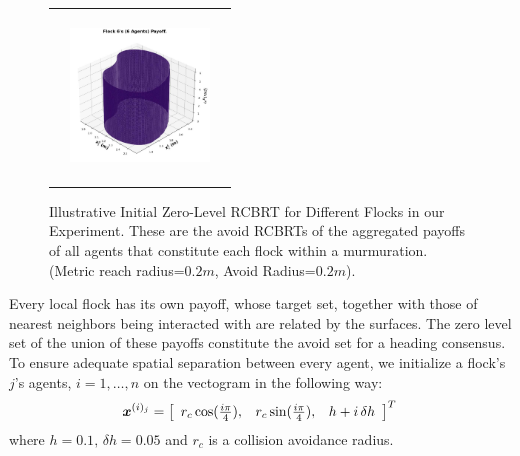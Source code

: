 \begin{figure}[tb!]
\begin{tabular}{ccc}
		&
		\includegraphics[height=12em,width=10em]{figures/flock_6.jpg}
	\end{tabular}
	\caption{\footnotesize Illustrative Initial Zero-Level RCBRT for Different Flocks in our Experiment. These are the avoid RCBRTs of the aggregated payoffs of all  agents that constitute each  flock within a murmuration.  (Metric reach radius=$0.2m$, Avoid Radius=$0.2m$).} 
	\label{fig:flocks_multi}
\end{figure}


Every local flock has its own payoff, whose target set, together with those of nearest neighbors being interacted with are related by the surfaces. The zero level set of the union of these payoffs constitute the avoid set for a heading consensus. To ensure adequate spatial separation between every agent, we initialize a flock's $j$'s agents, $i=1,\ldots, n$ on the vectogram in the following way:
%
\begin{align}
	\state^{(i)_j} = \left[\begin{array}{ccc}
		r_c \cos (\frac{i\pi}{4}), & 	r_c \sin (\frac{i\pi}{4}), & h+i\,\delta h
	\end{array}\right]^T \, %
\end{align}
%
where $h=0.1, \, \delta h = 0.05$ and $r_c$ is a collision avoidance radius.

